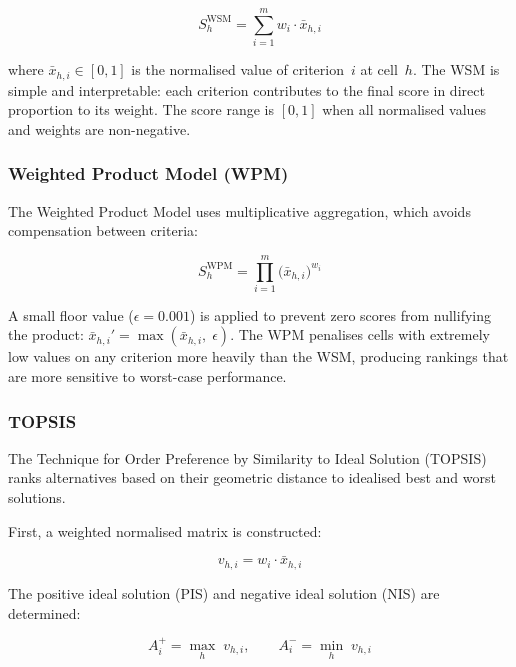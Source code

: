\begin{equation}
\label{eq:wsm}
S_h^{\text{WSM}} = \sum_{i=1}^{m} w_i \cdot \bar{x}_{h,i}
\end{equation}

\noindent where $\bar{x}_{h,i} \in [0,1]$ is the normalised value of criterion~$i$ at cell~$h$. The WSM is simple and interpretable: each criterion contributes to the final score in direct proportion to its weight. The score range is $[0, 1]$ when all normalised values and weights are non-negative.

\subsubsection{Weighted Product Model (WPM)}

The Weighted Product Model uses multiplicative aggregation, which avoids compensation between criteria:

\begin{equation}
\label{eq:wpm}
S_h^{\text{WPM}} = \prod_{i=1}^{m} \bigl(\bar{x}_{h,i}\bigr)^{w_i}
\end{equation}

\noindent A small floor value ($\epsilon = 0.001$) is applied to prevent zero scores from nullifying the product: $\bar{x}_{h,i}' = \max(\bar{x}_{h,i},\; \epsilon)$. The WPM penalises cells with extremely low values on any criterion more heavily than the WSM, producing rankings that are more sensitive to worst-case performance.

\subsubsection{TOPSIS}

The Technique for Order Preference by Similarity to Ideal Solution (TOPSIS)~\cite{hwang1981topsis} ranks alternatives based on their geometric distance to idealised best and worst solutions.

First, a weighted normalised matrix is constructed:

\begin{equation}
v_{h,i} = w_i \cdot \bar{x}_{h,i}
\end{equation}

\noindent The positive ideal solution (PIS) and negative ideal solution (NIS) are determined:

\begin{equation}
A^{+}_i = \max_{h} \; v_{h,i}, \qquad
A^{-}_i = \min_{h} \; v_{h,i}
\end{equation}

